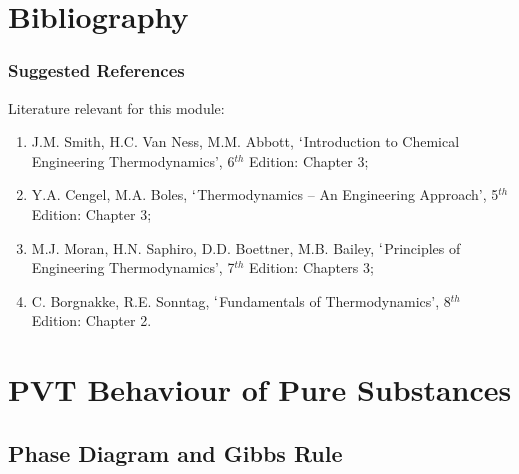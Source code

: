 \documentclass[10pt,compress]{beamer}
\begin{document}
\section{Bibliography}
\begin{frame}
 \frametitle{Suggested References}
  Literature relevant for this module:
  \begin{enumerate}[1.]
   \item J.M. Smith, H.C. Van Ness, M.M. Abbott, $\lq$Introduction to Chemical Engineering Thermodynamics', 6$^{th}$ Edition: Chapter 3;
   \item Y.A. Cengel, M.A. Boles, $\lq$Thermodynamics -- An Engineering Approach', 5$^{th}$ Edition: Chapter 3; 
   \item M.J. Moran, H.N. Saphiro, D.D. Boettner, M.B. Bailey, $\lq$Principles of Engineering Thermodynamics', 7$^{th}$ Edition: Chapters 3;
   \item C. Borgnakke, R.E. Sonntag, $\lq$Fundamentals of Thermodynamics', 8$^{th}$ Edition: Chapter 2.
  \end{enumerate}
\end{frame}



\section{PVT Behaviour of Pure Substances}

\subsection{Phase Diagram and Gibbs Rule} 
\end{document}
